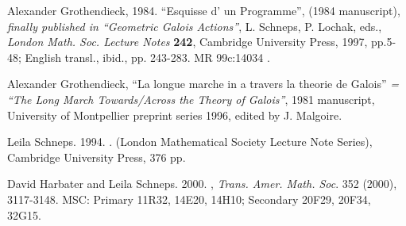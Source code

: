 \documentclass[12pt]{article}
\theoremstyle{plain}
\theoremstyle{definition}
\numberwithin{equation}{section}
\begin{document}
\begin{thebibliography}{99}
Alexander Grothendieck, 1984. ``Esquisse d' un Programme'', (1984 manuscript), 
{\em finally published in ``Geometric Galois Actions''}, L. Schneps, P. Lochak, eds., 
{\em London Math. Soc. Lecture Notes} {\bf 242}, Cambridge University Press, 1997, pp.5-48;
English transl., ibid., pp. 243-283. MR 99c:14034 .

Alexander Grothendieck, ``La longue marche in a travers la theorie de Galois'' 
\emph{= ``The Long March Towards/Across the Theory of Galois''}, 1981 manuscript, University of Montpellier preprint series 1996, edited by J. Malgoire. 

Leila Schneps. 1994. 
.
(London Mathematical Society Lecture Note Series), Cambridge University Press, 376 pp.

David Harbater and Leila Schneps. 2000.
, \emph{Trans. Amer. Math. Soc}. 352 (2000), 3117-3148. 
MSC: Primary 11R32, 14E20, 14H10; Secondary 20F29, 20F34, 32G15.

\end{thebibliography}

\end{document}
